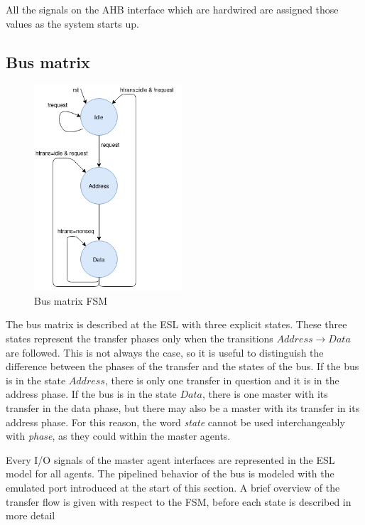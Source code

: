 All the signals on the AHB interface which are hardwired are assigned those values as the system starts up. 

\subsection{Bus matrix}
\label{sub:bus-matrix}
\begin{figure}
\includegraphics[width=5.5cm]{figs/ESL/Bus_fsm_new.png}
\caption{Bus matrix FSM}\label{fig:busfsm}
\end{figure}
The bus matrix is described at the ESL with three explicit states. These three states represent the transfer phases only when the transitions $Address\rightarrow Data$ are followed. This is not always the case, so it is useful to distinguish the difference between the phases of the transfer and the states of the bus. If the bus is in the state $Address$, there is only one transfer in question and it is in the address phase. If the bus is in the state $Data$, there is one master with its transfer in the data phase, but there may also be a master with its transfer in its address phase. For this reason, the word \textit{state} cannot be used interchangeably with \textit{phase}, as they could within the master agents.\par
Every I/O signals of the master agent interfaces are represented in the ESL model for all agents. The pipelined behavior of the bus is modeled with the emulated port introduced at the start of this section. A brief overview of the transfer flow is given with respect to the FSM, before each state is described in more detail \par

